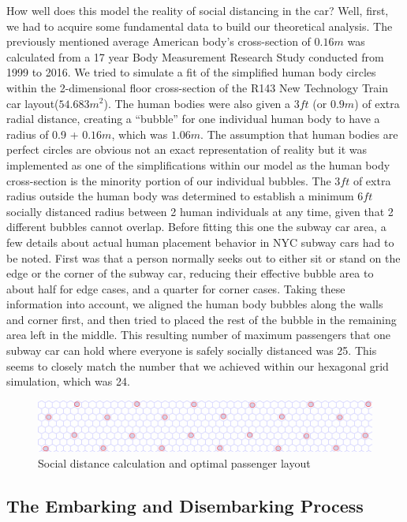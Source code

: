 \documentclass[12pt]{article}
\begin{document}
How well does this model the reality of social distancing in the car?
Well, first, we had to acquire some fundamental data to build our theoretical analysis. The previously mentioned average American body’s cross-section of $0.16m$ was calculated from a 17 year Body Measurement Research Study conducted from 1999 to 2016. We tried to simulate a fit of the simplified human body circles within the 2-dimensional floor cross-section of the R143 New Technology Train car layout($54.683m^{2}$). The human bodies were also given a $3ft$ (or $0.9m$) of extra radial distance, creating a “bubble” for one individual human body to have a radius of 0.9 + $0.16m$, which was $1.06m$. The assumption that human bodies are perfect circles are obvious not an exact representation of reality but it was implemented as one of the simplifications within our model as the human body cross-section is the minority portion of our individual bubbles. The $3ft$ of extra radius outside the human body was determined to establish a minimum $6ft$ socially distanced radius between 2 human individuals at any time, given that 2 different bubbles cannot overlap. Before fitting this one the subway car area, a few details about actual human placement behavior in NYC subway cars had to be noted. First was that a person normally seeks out to either sit or stand on the edge or the corner of the subway car, reducing their effective bubble area to about half for edge cases, and a quarter for corner cases. Taking these information into account, we aligned the human body bubbles along the walls and corner first, and then tried to placed the rest of the bubble in the remaining area left in the middle. This resulting number of maximum passengers that one subway car can hold where everyone is safely socially distanced was 25. This seems to closely match the number that we achieved within our hexagonal grid simulation, which was 24. 
\begin{figure}[h]
	\centering
	\includegraphics[scale=.45]{./figures/hex-train-full-safe.png}
	\caption{Social distance calculation and optimal passenger layout}
	\label{social-distance-full-grid}
\end{figure}

\subsection{The Embarking and Disembarking Process}
\end{document}
